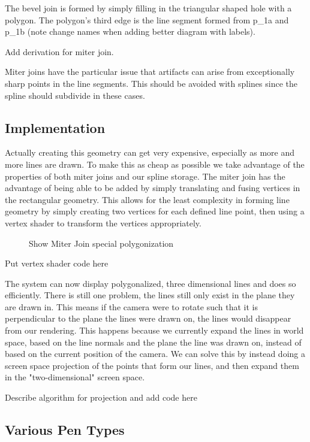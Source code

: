 \documentclass{article}
\begin{document}
The bevel join is formed by simply filling in the triangular shaped hole with a polygon. 
The polygon's third edge is the line segment formed from p_1a and p_1b (note change names when adding better diagram with labels).

Add derivation for miter join.

 
Miter joins have the particular issue that artifacts can arise from exceptionally sharp points in the line segments. 
This should be avoided with splines since the spline should subdivide in these cases.

\subsection{Implementation}

Actually creating this geometry can get very expensive, especially as more and more lines are drawn. 
To make this as cheap as possible we take advantage of the properties of both miter joins and our spline storage.
The miter join has the advantage of being able to be added by simply translating and fusing vertices in the rectangular geometry. 
This allows for the least complexity in forming line geometry by simply creating two vertices for each defined line point, then using a vertex shader to transform the vertices appropriately.

\begin{figure}
	\caption{Show Miter Join special polygonization }
\end{figure}

Put vertex shader code here

The system can now display polygonalized, three dimensional lines and does so efficiently.
There is still one problem, the lines still only exist in the plane they are drawn in.
This means if the camera were to rotate such that it is perpendicular to the plane the lines were drawn on, the lines would disappear from our rendering.
This happens because we currently expand the lines in world space, based on the line normals and the plane the line was drawn on, instead of based on the current position of the camera.
We can solve this by instead doing a screen space projection of the points that form our lines, and then expand them in the "two-dimensional" screen space.

Describe algorithm for projection and add code here

\subsection{Various Pen Types}

 
\end{document}
